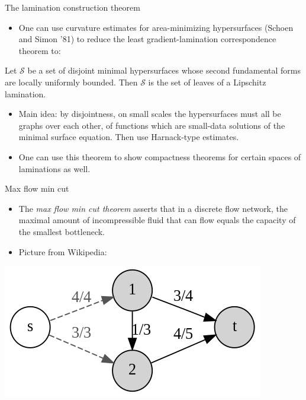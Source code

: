 \documentclass[10pt]{beamer}
\begin{document}
\begin{frame}{The lamination construction theorem}
\begin{itemize}
\item One can use curvature estimates for area-minimizing hypersurfaces (Schoen and Simon '81) to reduce the least gradient-lamination correspondence theorem to: \pause
\end{itemize}

\begin{theorem}
Let $\mathscr S$ be a set of disjoint minimal hypersurfaces whose second fundamental forms are locally uniformly bounded.
Then $\mathscr S$ is the set of leaves of a Lipschitz lamination.
\end{theorem} \pause

\begin{itemize}
\item Main idea: by disjointness, on small scales the hypersurfaces must all be graphs over each other, of functions which are small-data solutions of the minimal surface equation. Then use Harnack-type estimates. \pause
\item One can use this theorem to show compactness theorems for certain spaces of laminations as well.
\end{itemize}
\end{frame}

\begin{frame}{Max flow min cut}
\begin{itemize}
\item The \emph{max flow min cut theorem} asserts that in a discrete flow network, the maximal amount of incompressible fluid that can flow equals the capacity of the smallest bottleneck. \pause
\item Picture from Wikipedia:
\end{itemize}

\begin{center}
    \includegraphics[scale=0.75]{Max-flow_min-cut_example.svg.png}
\end{center}
\end{frame}
\end{document}
